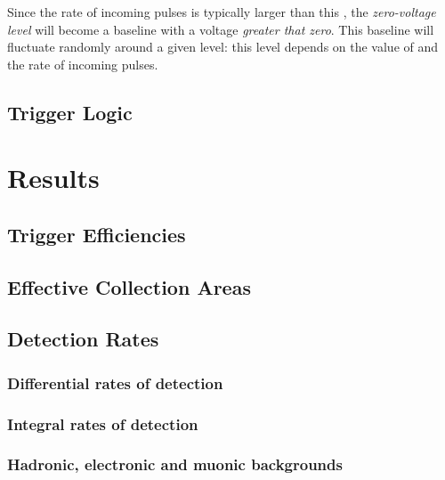 Since the rate of incoming pulses is typically larger than this \tRC,
the \emph{zero-voltage level} will become a baseline with a voltage
\emph{greater that zero}. This baseline will fluctuate randomly around
a given level: this level depends on the value of \tRC and the rate of
incoming pulses.

\pulsefig

\subsection{Trigger Logic}

\section{Results}

\subsection{Trigger Efficiencies}

\subsection{Effective Collection Areas}

\subsection{Detection Rates}

\subsubsection{Differential rates of detection}

\subsubsection{Integral rates of detection}

\subsubsection{Hadronic, electronic and muonic backgrounds}

\endinput
%


